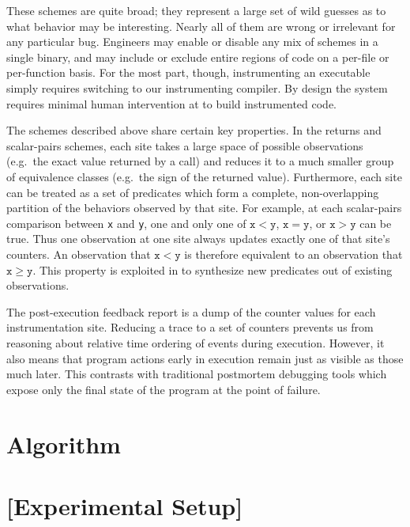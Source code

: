 \documentclass{sig-alternate}
\newcommand{\placeholder}[1]{{\color[cmyk]{0,0.61,0.87,0}[#1]}}
\begin{document}
These schemes are quite broad; they represent a large set of wild
guesses as to what behavior may be interesting.  Nearly all of them
are wrong or irrelevant for any particular bug.  Engineers may enable
or disable any mix of schemes in a single binary, and may include or
exclude entire regions of code on a per-file or per-function basis.
For the most part, though, instrumenting an executable simply requires
switching to our instrumenting compiler.  By design the system
requires minimal human intervention at to build instrumented code.

The schemes described above share certain key properties.  In the
returns and scalar-pairs schemes, each site takes a large space of
possible observations (e.g.\ the exact value returned by a call) and
reduces it to a much smaller group of equivalence classes (e.g.\ the
sign of the returned value).  Furthermore, each site can be treated as
a set of predicates which form a complete, non-overlapping partition
of the behaviors observed by that site.  For example, at each
scalar-pairs comparison between \texttt{x} and \texttt{y}, one and
only one of $\mathtt{x} < \mathtt{y}$, $\mathtt{x} = \mathtt{y}$, or
$\mathtt{x} > \mathtt{y}$ can be true.  Thus one observation at one
site always updates exactly one of that site's counters.  An
observation that $\mathtt{x} < \mathtt{y}$ is therefore equivalent to
an observation that $\mathtt{x} \geq \mathtt{y}$.  This property is
exploited in  to synthesize new predicates out
of existing observations.

The post-execution feedback report is a dump of the counter values for
each instrumentation site.  Reducing a trace to a set of counters
prevents us from reasoning about relative time ordering of events
during execution.  However, it also means that program actions early
in execution remain just as visible as those much later.  This
contrasts with traditional postmortem debugging tools which expose
only the final state of the program at the point of failure.

\section{Algorithm}
\label{sec:algorithm}


\section{\placeholder{Experimental Setup}}
\label{sec:experiments:setup}

\end{document}
